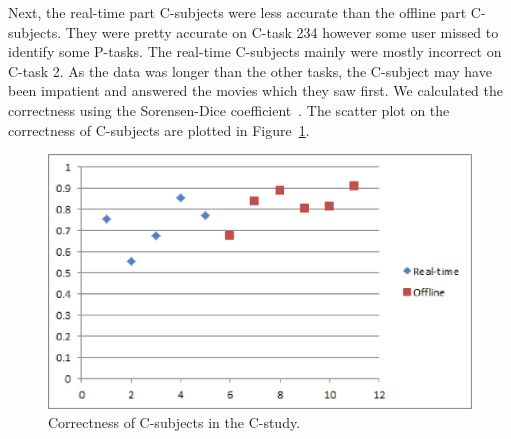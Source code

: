 Next, the real-time part C-subjects were less accurate than the offline part C-subjects. They were pretty accurate on C-task 234 however some user missed to identify some P-tasks. The real-time C-subjects mainly were mostly incorrect on C-task 2. As the data was longer than the other tasks, the C-subject may have been impatient and answered the movies which they saw first. We calculated the correctness using the Sorensen-Dice coefficient~\cite{sorensen1948method}. The scatter plot on the correctness of C-subjects are plotted in Figure~\ref{fig:Scatter}.
\begin{figure}[htb]
  \centering
  \includegraphics[width=0.9\linewidth]{images/Scatter.eps}
  \caption{Correctness of C-subjects in the C-study.}
	\label{fig:Scatter}
\end{figure} 